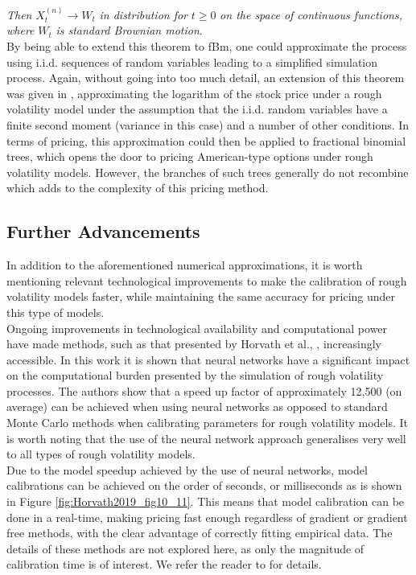 \documentclass[12pt,oneside]{article}
\begin{document}
\emph{Then} $X_t^{(n)} \rightarrow W_t$ \emph{in distribution for} $t\ge0$ \emph{on the space of continuous functions, where} $W_t$ \emph{is standard Brownian motion}.
\\

By being able to extend this theorem to fBm, one could approximate the process using i.i.d. sequences of random variables leading to a simplified simulation process. Again, without going into too much detail, an extension of this theorem was given in \cite{Horvath2017}, approximating the logarithm of the stock price under a rough volatility model under the assumption that the i.i.d. random variables have a finite second moment (variance in this case) and a number of other conditions. In terms of pricing, this approximation could then be applied to fractional binomial trees, which opens the door to pricing American-type options under rough volatility models. However, the branches of such trees generally do not recombine which adds to the complexity of this pricing method.   

\subsection{Further Advancements}
\label{subsec:tech_advancement}

In addition to the aforementioned numerical approximations, it is worth mentioning relevant technological improvements to make the calibration of rough volatility models faster, while maintaining the same accuracy for pricing under this type of models.
\\

 Ongoing improvements in technological availability and computational power have made methods, such as that presented by Horvath et al., \cite{Horvath2019}, increasingly accessible. In this work it is shown that neural networks have a significant impact on the computational burden presented by the simulation of rough volatility processes. The authors show that a speed up factor of approximately 12,500 (on average) can be achieved when using neural networks as opposed to standard Monte Carlo methods when calibrating parameters for rough volatility models. It is worth noting that the use of the neural network approach generalises very well to all types of rough volatility models. 
 \\
 
 Due to the model speedup achieved by the use of neural networks, model calibrations can be achieved on the order of seconds, or milliseconds as is shown in Figure \ref{fig:Horvath2019_fig10_11}. This means that model calibration can be done in a real-time, making pricing fast enough regardless of gradient or gradient free methods, with the clear advantage of correctly fitting empirical data. The details of these methods are not explored here, as only the magnitude of calibration time is of interest. We refer the reader to \cite{Horvath2019} for details.
 
\end{document}
